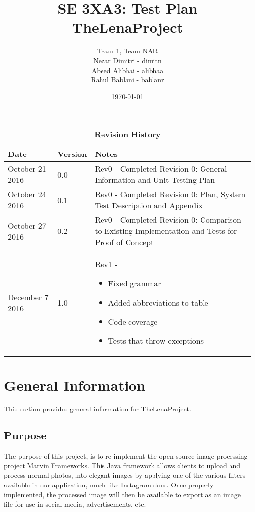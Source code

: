 \documentclass[12pt, titlepage]{article}
\title{SE 3XA3: Test Plan\\TheLenaProject}
\author{Team 1, Team NAR
        \\ Nezar Dimitri - dimitn
        \\ Abeed Alibhai - alibhaa
		\\ Rahul Bablani - bablanr
}
\date{\today}
\begin{document}
\maketitle

\tableofcontents
\listoftables

\newpage

\begin{table}[bp]
\caption{\bf Revision History}
\begin{tabularx}{\textwidth}{p{3cm}p{2cm}X}
\toprule {\bf Date} & {\bf Version} & {\bf Notes}\\
\midrule
October 21 2016 & 0.0 & Rev0 - Completed Revision 0: General Information and Unit Testing Plan\\
October 24 2016 & 0.1 & Rev0 - Completed Revision 0: Plan, System Test Description and Appendix\\
October 27 2016 & 0.2 & Rev0 - Completed Revision 0: Comparison to Existing Implementation and Tests for Proof of Concept\\
December 7 2016 & 1.0 & Rev1 - 
\begin{itemize}
	\item Fixed grammar
	\item Added abbreviations to table
	\item Code coverage
	\item Tests that throw exceptions
\end{itemize}


\end{tabularx}
\end{table}


\clearpage



\section{General Information}

This section provides general information for TheLenaProject.

\subsection{Purpose}

The purpose of this project, is to re-implement the open source image processing project Marvin Frameworks. This Java framework allows clients to upload and process normal photos, into elegant images by applying one of the various filters available in our application, much like Instagram does. Once properly implemented, the processed image will then be available to export as an image file for use in social media, advertisements, etc.
\end{document}
